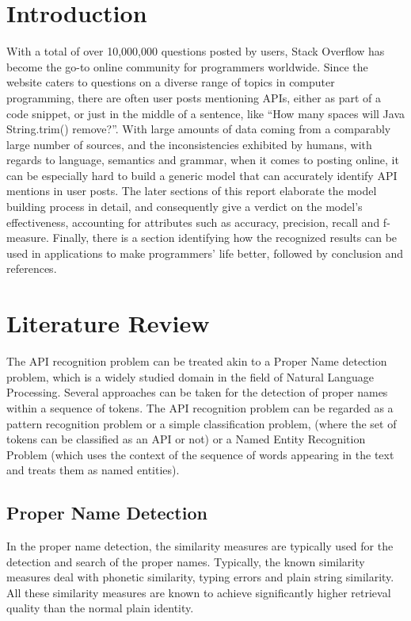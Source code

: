 \documentclass{sig-alternate-05-2015}
\begin{document}
\section{Introduction}
With a total of over 10,000,000 questions posted by users, Stack Overflow has become the go-to online community for programmers worldwide. Since the website caters to questions on a diverse range of topics in computer programming, there are often user posts mentioning APIs, either as part of a code snippet, or just in the middle of a sentence, like “How many spaces will Java String.trim() remove?”. With large amounts of data coming from a comparably large number of sources, and the inconsistencies exhibited by humans, with regards to language, semantics and grammar, when it comes to posting online, it can be especially hard to build a generic model that can accurately identify API mentions in user posts. The later sections of this report elaborate the model building process in detail, and consequently give a verdict on the model’s effectiveness, accounting for attributes such as accuracy, precision, recall and f-measure. Finally, there is a section identifying how the recognized results can be used in applications to make programmers’ life better, followed by conclusion and references.



\section{Literature Review}
The API recognition problem can be treated akin to a Proper Name detection problem, which is a widely studied domain in the field of Natural Language Processing. Several approaches can be taken for the detection of proper names within a sequence of tokens.
The API recognition problem can be regarded as a pattern recognition problem or a simple classification problem, (where the set of tokens can be classified as an API or not) or a Named Entity Recognition \cite{grishman1996message} Problem (which uses the context of the sequence of words appearing in the text and treats them as named entities).

\subsection{Proper Name Detection}
In the proper name detection, the similarity measures are typically used for the detection and search of the proper names. Typically, the known similarity measures deal with phonetic similarity, typing errors and plain string similarity. All these similarity measures are known to achieve significantly higher retrieval quality than the normal plain identity. \cite{pfeifer1996retrieval}
\end{document}
